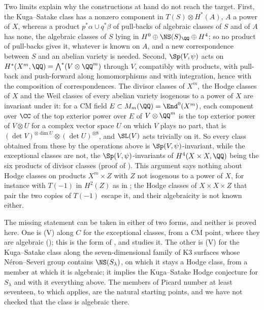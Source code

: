 \begin{remark}
Two limits explain why the constructions at hand do not reach the target.
First, the Kuga--Satake class has a nonzero component in $T(S)\otimes
H^{*}(A)$, $A$ a power of $X$, whereas a product $p^{*}\alpha\cup q^{*}\beta$
of pull-backs of algebraic classes of $S$ and of $A$ has none, the algebraic
classes of $S$ lying in $H^{0}\oplus\NS(S)_{\QQ}\oplus H^{4}$; so no product
of pull-backs gives it, whatever is known on $A$, and a new correspondence
between $S$ and an abelian variety is needed. Second, $\Sp(V,\psi)$ acts on
$H^{*}(X^{m},\QQ)=\bigwedge^{*}(V\otimes\QQ^{m})$ through $V$, compatibly with
products, with pull-back and push-forward along homomorphisms and with
integration, hence with the composition of correspondences. The divisor
classes of $X^{m}$, the Hodge classes of $X$ and the Weil classes of every
abelian variety isogenous to a power of $X$ are invariant under it: for a CM
field $E\subset M_{m}(\QQ)=\End^{0}(X^{m})$, each component over $\CC$ of
the top exterior power over $E$ of $V\otimes\QQ^{m}$ is the top exterior power
of $V\otimes U$ for a complex vector space $U$ on which $V$ plays no part,
that is $(\det V)^{\otimes\dim U}\otimes(\det U)^{\otimes8}$, and $\SL(V)$ acts
trivially on it. So every class obtained from these by the operations
above is $\Sp(V,\psi)$-invariant, while the exceptional classes are not, the
$\Sp(V,\psi)$-invariants of $H^{4}(X\times X,\QQ)$ being the six products of
divisor classes (proof of ). This argument says
nothing about Hodge classes on products $X^{m}\times Z$ with $Z$ not isogenous
to a power of $X$, for instance with $T(-1)$ in $H^{2}(Z)$ as in
; the Hodge classes of $X\times X\times Z$ that pair
the two copies of $T(-1)$ escape it, and their algebraicity is not known
either.

The missing statement can be taken in either of two forms, and neither is
proved here. One is \textup{(V)} along $C$ for the exceptional classes, from a
CM point, where they are algebraic (); this is the form of
, and  studies it. The other
is \textup{(V)} for the Kuga--Satake class along the seven-dimensional family
of K3 surfaces whose N\'eron--Severi group contains $\NS(S_{\lambda})$, on
which it stays a Hodge class, from a member at which it is algebraic; it
implies the Kuga--Satake Hodge conjecture for $S_{\lambda}$ and with it
everything above. The members of Picard number at least seventeen, to which
\cite{Mor84} applies, are the natural starting points, and we have not checked
that the class is algebraic there.
\end{remark}


